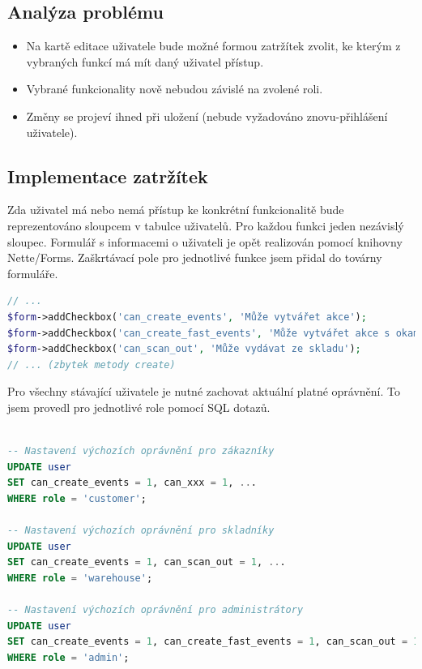\subsection{Analýza problému}

\begin{itemize}
    \item Na kartě editace uživatele bude možné formou zatržítek zvolit, ke kterým z vybraných funkcí má mít daný uživatel přístup.
    \item Vybrané funkcionality nově nebudou závislé na zvolené roli.
    \item Změny se projeví ihned při uložení (nebude vyžadováno znovu-přihlášení uživatele).
\end{itemize}

\subsection{Implementace zatržítek}

Zda uživatel má nebo nemá přístup ke konkrétní funkcionalitě bude reprezentováno sloupcem v tabulce uživatelů. Pro každou funkci jeden nezávislý sloupec. Formulář s informacemi o uživateli je opět realizován pomocí knihovny Nette/Forms. Zaškrtávací pole pro jednotlivé funkce jsem přidal do továrny formuláře.

\begin{lstlisting}[language=php, label=src:UserFormFactory.php,caption={Úprava továrny pro formulář uživatelů }]
// ...
$form->addCheckbox('can_create_events', 'Může vytvářet akce');
$form->addCheckbox('can_create_fast_events', 'Může vytvářet akce s okamžitým odběrem');
$form->addCheckbox('can_scan_out', 'Může vydávat ze skladu');
// ... (zbytek metody create)

\end{lstlisting}

Pro všechny stávající uživatele je nutné zachovat aktuální platné oprávnění. To jsem provedl pro jednotlivé role pomocí SQL dotazů. 

\begin{lstlisting}[language=SQL,label=src:UserFormFactory.php,caption={Nastavení výchozích oprávnění pro jednotlivé role uživatelů}]

-- Nastavení výchozích oprávnění pro zákazníky
UPDATE user
SET can_create_events = 1, can_xxx = 1, ...
WHERE role = 'customer';

-- Nastavení výchozích oprávnění pro skladníky
UPDATE user
SET can_create_events = 1, can_scan_out = 1, ...
WHERE role = 'warehouse';

-- Nastavení výchozích oprávnění pro administrátory
UPDATE user
SET can_create_events = 1, can_create_fast_events = 1, can_scan_out = 1, ...
WHERE role = 'admin';

\end{lstlisting}



